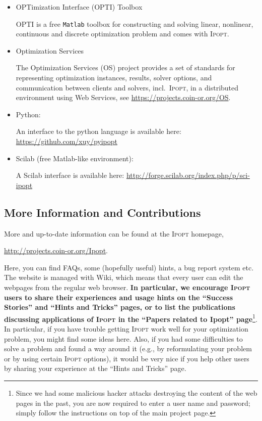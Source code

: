 \documentclass[10pt]{article}
\newcommand{\Ipopt}{\textsc{Ipopt}\xspace}
\begin{document}
\begin{itemize}
\item OPTimization Interface (OPTI) Toolbox

  OPTI is a free {\tt Matlab} toolbox for constructing and solving linear, 
  nonlinear, continuous and discrete optimization problem and comes with 
  \Ipopt.

\item Optimization Services

  The Optimization Services (OS) project provides a set of standards 
  for representing optimization instances, results, solver options, 
  and communication between clients and solvers, incl.\ \Ipopt, in a 
  distributed environment using Web Services, see
  \url{https://projects.coin-or.org/OS}.

\item Python:

  An interface to the python language is available here: 
  \url{https://github.com/xuy/pyipopt}
    
\item Scilab (free Matlab-like environment):


  A Scilab interface is available here: 
  \url{http://forge.scilab.org/index.php/p/sci-ipopt}
\end{itemize}

\subsection{More Information and Contributions}
More and up-to-date information can be found at the \Ipopt homepage,

\begin{center}
\url{http://projects.coin-or.org/Ipopt}.
\end{center}

Here, you can find FAQs, some (hopefully useful) hints, a bug report
system etc.  The website is managed with Wiki, which means that every
user can edit the webpages from the regular web browser.  {\bf In
  particular, we encourage \Ipopt users to share their experiences
  and usage hints on the ``Success Stories'' and ``Hints and Tricks''
  pages, or to list the publications discussing applications of
  \Ipopt in the ``Papers related to Ipopt'' page}\footnote{Since we
  had some malicious hacker attacks destroying the content of the web
  pages in the past, you are now required to enter a user name and
  password; simply follow the instructions on top of the main project
  page.}.  In particular, if you have trouble getting \Ipopt work
well for your optimization problem, you might find some ideas here.
Also, if you had some difficulties to solve a problem and found a way
around it (e.g., by reformulating your problem or by using certain
\Ipopt options), it would be very nice if you help other users by
sharing your experience at the ``Hints and Tricks'' page.
\end{document}
